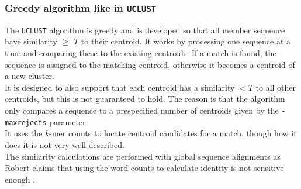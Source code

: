 \subsubsection{Greedy algorithm like in \texttt{UCLUST}} 
The \texttt{UCLUST} algorithm is greedy and is developed so that all member sequence have similarity $\geq$ $T$ to their centroid.
It works by processing one sequence at a time and comparing these to the 
existing centroids. If a match is found, the sequence is assigned to the 
matching centroid, otherwise it becomes a centroid of a new cluster.\\
It is designed to also support that each centroid has a similarity $<T$ to 
all other centroids, but this is not guaranteed to hold. The reason is that 
the algorithm only compares a sequence to a prespecified number of centroids 
given by the \texttt{-maxrejects} parameter.\\
It uses the $k$-mer counts to locate centroid candidates for a match, 
though how it does it is not very well described.\\
The similarity calculations are performed with global sequence alignments as 
Robert claims that using the word counts to calculate identity is not 
sensitive enough \cite{usearch}.



